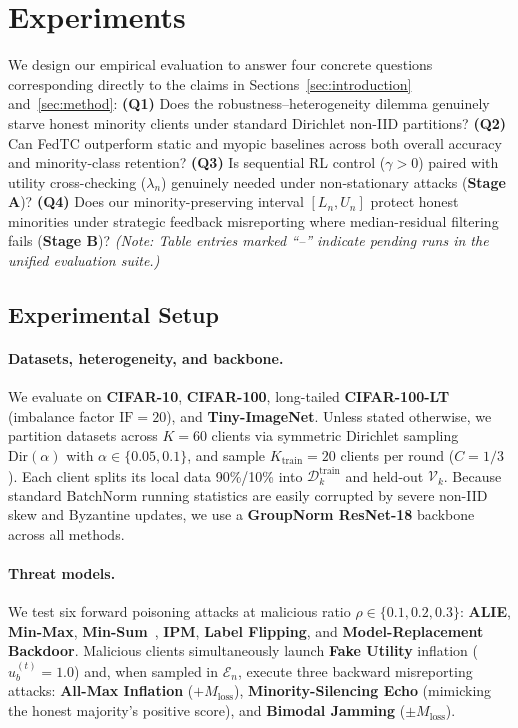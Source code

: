 \section{Experiments}
\label{sec:experiments}

We design our empirical evaluation to answer four concrete questions corresponding directly to the claims in Sections~\ref{sec:introduction} and~\ref{sec:method}:
\textbf{(Q1)} Does the robustness--heterogeneity dilemma genuinely starve honest minority clients under standard Dirichlet non-IID partitions?
\textbf{(Q2)} Can FedTC outperform static and myopic baselines across both overall accuracy and minority-class retention?
\textbf{(Q3)} Is sequential RL control ($\gamma > 0$) paired with utility cross-checking ($\lambda_n$) genuinely needed under non-stationary attacks (\textbf{Stage A})?
\textbf{(Q4)} Does our minority-preserving interval $[L_n, U_n]$ protect honest minorities under strategic feedback misreporting where median-residual filtering fails (\textbf{Stage B})?
\emph{(Note: Table entries marked ``--'' indicate pending runs in the unified evaluation suite.)}

\subsection{Experimental Setup}
\label{sec:exp_setup}

\paragraph{Datasets, heterogeneity, and backbone.}
We evaluate on \textbf{CIFAR-10}, \textbf{CIFAR-100}, long-tailed \textbf{CIFAR-100-LT} (imbalance factor $\mathrm{IF}=20$), and \textbf{Tiny-ImageNet}. Unless stated otherwise, we partition datasets across $K = 60$ clients via symmetric Dirichlet sampling $\mathrm{Dir}(\alpha)$ with $\alpha \in \{0.05, 0.1\}$, and sample $K_{\mathrm{train}} = 20$ clients per round ($C = 1/3$). Each client splits its local data 90\%/10\% into $\mathcal{D}_k^{\mathrm{train}}$ and held-out $\mathcal{V}_k$. Because standard BatchNorm running statistics are easily corrupted by severe non-IID skew and Byzantine updates, we use a \textbf{GroupNorm ResNet-18} backbone across all methods.

\paragraph{Threat models.}
We test six forward poisoning attacks at malicious ratio $\rho \in \{0.1, 0.2, 0.3\}$: \textbf{ALIE}, \textbf{Min-Max}, \textbf{Min-Sum}~\cite{shejwalkar2021manipulating}, \textbf{IPM}, \textbf{Label Flipping}, and \textbf{Model-Replacement Backdoor}. Malicious clients simultaneously launch \textbf{Fake Utility} inflation ($u_b^{(t)} = 1.0$) and, when sampled in $\mathcal{E}_n$, execute three backward misreporting attacks: \textbf{All-Max Inflation} ($+M_{\mathrm{loss}}$), \textbf{Minority-Silencing Echo} (mimicking the honest majority's positive score), and \textbf{Bimodal Jamming} ($\pm M_{\mathrm{loss}}$).

